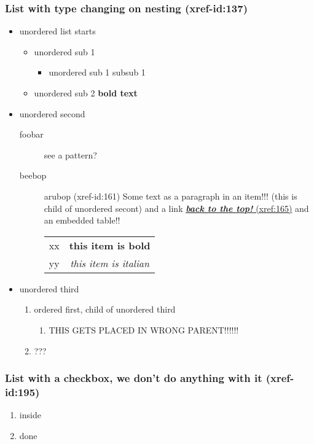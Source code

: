 \documentclass[11pt]{article}
\begin{document}
\subsubsection{List with type changing on nesting   (xref-id:137)  }
 \label{obj-137}
 \label{obj-136}
\begin{itemize}
\item
unordered list starts
\begin{itemize}
\item
unordered sub 1
\begin{itemize}
\item
unordered sub 1 subsub 1
\end{itemize}
\item
unordered sub 2
\textbf{bold text}
\end{itemize}
\item
unordered second 
\begin{description}
\item[foobar]
see a pattern?
\item[beebop]
arubop
\label{obj-161} (xref-id:161)
  Some text as a paragraph in an item!!! (this is child of unordered secont)
and a link
\hyperref[obj-15]{\textbf{\emph{back to the top!}} (xref:165)}
  and an embedded table!!

\begin{tabular}{|c|c|}
\hline
 xx  & \textbf{this item is bold} \\
 yy  & \emph{this item is italian} \\
\hline
\end{tabular}
\end{description}
\item
unordered third
\begin{enumerate}
\item
ordered first, child of unordered third
\begin{enumerate}
\item
THIS GETS PLACED IN WRONG PARENT!!!!!!
\end{enumerate}
\item
???
\end{enumerate}
\vspace{\baselineskip}
\vspace{\baselineskip}
\end{itemize}
\vspace{\baselineskip}
\subsubsection{List with a checkbox, we don't do anything with it   (xref-id:195)  }
 \label{obj-195}
 \label{obj-194}
\begin{enumerate}
\item
inside
\item
done
\vspace{\baselineskip}
\vspace{\baselineskip}
\end{enumerate}
\end{document}
